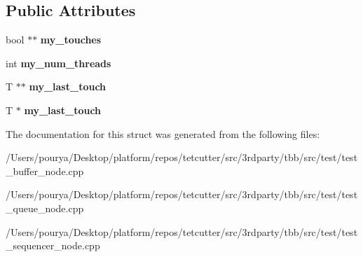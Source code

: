 \subsection*{Public Attributes}
\begin{DoxyCompactItemize}
\item 
\hypertarget{structtouches_a109c7030d7f100fa67d21dba80cc8548}{}bool $\ast$$\ast$ {\bfseries my\+\_\+touches}\label{structtouches_a109c7030d7f100fa67d21dba80cc8548}

\item 
\hypertarget{structtouches_a8a49e2d1e1a0317116c8277c081baf0e}{}int {\bfseries my\+\_\+num\+\_\+threads}\label{structtouches_a8a49e2d1e1a0317116c8277c081baf0e}

\item 
\hypertarget{structtouches_a57a68ceab455040216f352ab68fe4c00}{}T $\ast$$\ast$ {\bfseries my\+\_\+last\+\_\+touch}\label{structtouches_a57a68ceab455040216f352ab68fe4c00}

\item 
\hypertarget{structtouches_a4c172e30d8eedbe8d9fa0aa93e2c3a22}{}T $\ast$ {\bfseries my\+\_\+last\+\_\+touch}\label{structtouches_a4c172e30d8eedbe8d9fa0aa93e2c3a22}

\end{DoxyCompactItemize}


The documentation for this struct was generated from the following files\+:\begin{DoxyCompactItemize}
\item 
/\+Users/pourya/\+Desktop/platform/repos/tetcutter/src/3rdparty/tbb/src/test/test\+\_\+buffer\+\_\+node.\+cpp\item 
/\+Users/pourya/\+Desktop/platform/repos/tetcutter/src/3rdparty/tbb/src/test/test\+\_\+queue\+\_\+node.\+cpp\item 
/\+Users/pourya/\+Desktop/platform/repos/tetcutter/src/3rdparty/tbb/src/test/test\+\_\+sequencer\+\_\+node.\+cpp\end{DoxyCompactItemize}
